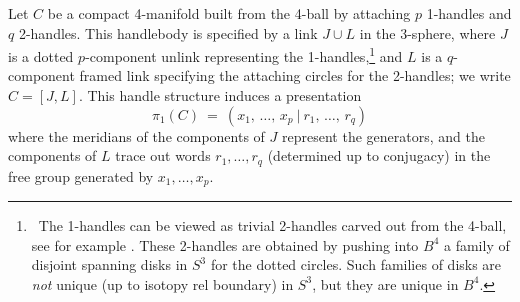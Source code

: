 \documentclass[11pt]{amsart}
\theoremstyle{definition}
\newtheorem{remark}[theorem]{Remark}
\newcommand{\head}[1]{\bigskip\noindent{\bf #1}}
\newcommand{\call}{\mathcal L}
\newcommand{\id}{\textup{id}}
\newcommand{\hto}{\hookrightarrow}
\newcommand{\del}{\partial}
\newcommand{\ac}{\textup{AC}}
\newcommand{\foot}[1]{\setcounter{footnote}{1}\footnote{\ #1}}
\begin{document}




\head{\ac-Corks}

Let $C$ be a compact 4-manifold built from the 4-ball by attaching $p$ 1-handles and $q$ 2-handles.  This handlebody is specified by a link $J\cup L$ in the 3-sphere, where $J$ is a dotted $p$-component unlink representing the 1-handles,\foot{The 1-handles can be viewed as trivial 2-handles carved out from the 4-ball, see for example \cite[Chapter I \S2]{kirby:4-manifolds}.  These 2-handles are obtained by pushing into $B^4$ a family of disjoint spanning disks in $S^3$ for the dotted circles.  Such families of disks are {\sl not} unique (up to isotopy rel boundary) in $S^3$, but they are unique in $B^4$.} and $L$ is a $q$-component framed link specifying the attaching circles for the 2-handles; we write $C = [J,L]$.  This handle structure induces a presentation
$$
\pi_1(C) \ = \ (x_1,\, \dots , \, x_p \ | \ r_1,\,\dots, \, r_q)
$$  
where the meridians of the components of $J$ represent the generators, and the components of $L$ trace out words $r_1,\dots, r_q$ (determined up to conjugacy) in the free group generated by $x_1,\dots, x_p$.  
\end{document}
